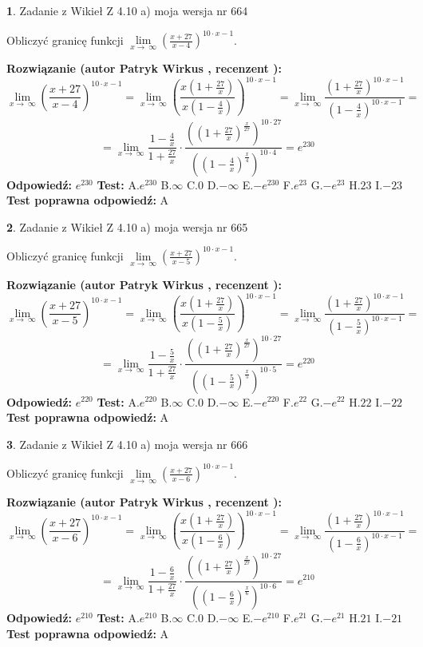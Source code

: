 \documentclass[12pt, a4paper]{article}
\theoremstyle{definition} %
\newtheorem{zad}{}
\newcommand{\zadStart}[1]{\begin{zad}#1\newline}
\newcommand{\zadStop}{\end{zad}}
\newcommand{\rozwStart}[2]{\noindent \textbf{Rozwiązanie (autor #1 , recenzent #2): }\newline}
\newcommand{\rozwStop}{\newline}
\newcommand{\odpStart}{\noindent \textbf{Odpowiedź:}\newline}
\newcommand{\odpStop}{\newline}
\newcommand{\testStart}{\noindent \textbf{Test:}\newline}
\newcommand{\testStop}{\newline}
\newcommand{\kluczStart}{\noindent \textbf{Test poprawna odpowiedź:}\newline}
\newcommand{\kluczStop}{\newline}
\begin{document}
\zadStart{Zadanie z Wikieł Z 4.10 a) moja wersja nr 664}

Obliczyć granicę funkcji  $\lim\limits_{x\to\ \infty}(\frac{x+27}{x-4})^{10\cdot x-1}$.
\zadStop
\rozwStart{Patryk Wirkus}{}
$$\lim\limits_{x\to\ \infty}(\frac{x+27}{x-4})^{10\cdot x-1} = \lim\limits_{x\to\ \infty}(\frac{x(1+\frac{27}{x})}{x(1-\frac{4}{x})})^{10\cdot x-1}=\lim\limits_{x\to\ \infty}\frac{(1+\frac{27}{x})^{10\cdot x-1}}{(1-\frac{4}{x})^{10\cdot x-1}}=$$
$$=\lim\limits_{x\to\ \infty}\frac{1-\frac{4}{x}}{1+\frac{27}{x}}\cdot\frac{((1+\frac{27}{x})^{\frac{x}{27}})^{10\cdot27}}{((1-\frac{4}{x})^{\frac{x}{4}})^{10\cdot4}}=e^{230}$$
\rozwStop
\odpStart
$e^{230}$
\odpStop
\testStart
A.$e^{230}$ B.$\infty$ C.$0$ D.$-\infty$ E.$-e^{230}$
F.$e^{23}$ G.$-e^{23}$
H.$23$
I.$-23$
\testStop
\kluczStart
A
\kluczStop



\zadStart{Zadanie z Wikieł Z 4.10 a) moja wersja nr 665}

Obliczyć granicę funkcji  $\lim\limits_{x\to\ \infty}(\frac{x+27}{x-5})^{10\cdot x-1}$.
\zadStop
\rozwStart{Patryk Wirkus}{}
$$\lim\limits_{x\to\ \infty}(\frac{x+27}{x-5})^{10\cdot x-1} = \lim\limits_{x\to\ \infty}(\frac{x(1+\frac{27}{x})}{x(1-\frac{5}{x})})^{10\cdot x-1}=\lim\limits_{x\to\ \infty}\frac{(1+\frac{27}{x})^{10\cdot x-1}}{(1-\frac{5}{x})^{10\cdot x-1}}=$$
$$=\lim\limits_{x\to\ \infty}\frac{1-\frac{5}{x}}{1+\frac{27}{x}}\cdot\frac{((1+\frac{27}{x})^{\frac{x}{27}})^{10\cdot27}}{((1-\frac{5}{x})^{\frac{x}{5}})^{10\cdot5}}=e^{220}$$
\rozwStop
\odpStart
$e^{220}$
\odpStop
\testStart
A.$e^{220}$ B.$\infty$ C.$0$ D.$-\infty$ E.$-e^{220}$
F.$e^{22}$ G.$-e^{22}$
H.$22$
I.$-22$
\testStop
\kluczStart
A
\kluczStop



\zadStart{Zadanie z Wikieł Z 4.10 a) moja wersja nr 666}

Obliczyć granicę funkcji  $\lim\limits_{x\to\ \infty}(\frac{x+27}{x-6})^{10\cdot x-1}$.
\zadStop
\rozwStart{Patryk Wirkus}{}
$$\lim\limits_{x\to\ \infty}(\frac{x+27}{x-6})^{10\cdot x-1} = \lim\limits_{x\to\ \infty}(\frac{x(1+\frac{27}{x})}{x(1-\frac{6}{x})})^{10\cdot x-1}=\lim\limits_{x\to\ \infty}\frac{(1+\frac{27}{x})^{10\cdot x-1}}{(1-\frac{6}{x})^{10\cdot x-1}}=$$
$$=\lim\limits_{x\to\ \infty}\frac{1-\frac{6}{x}}{1+\frac{27}{x}}\cdot\frac{((1+\frac{27}{x})^{\frac{x}{27}})^{10\cdot27}}{((1-\frac{6}{x})^{\frac{x}{6}})^{10\cdot6}}=e^{210}$$
\rozwStop
\odpStart
$e^{210}$
\odpStop
\testStart
A.$e^{210}$ B.$\infty$ C.$0$ D.$-\infty$ E.$-e^{210}$
F.$e^{21}$ G.$-e^{21}$
H.$21$
I.$-21$
\testStop
\kluczStart
A
\kluczStop
\end{document}
